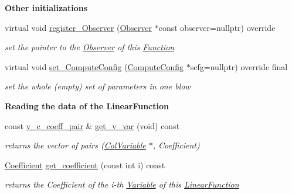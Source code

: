 \begin{Indent}\textbf{ Other initializations}\par
\begin{DoxyCompactItemize}
\item 
virtual void \mbox{\hyperlink{class_s_m_spp__di__unipi__it_1_1_linear_function_a0cb7093b112bfafe0b6d2b44f42fcc5a}{register\+\_\+\+Observer}} (\mbox{\hyperlink{class_s_m_spp__di__unipi__it_1_1_observer}{Observer}} $\ast$const observer=nullptr) override
\begin{DoxyCompactList}\small\item\em set the pointer to the \mbox{\hyperlink{class_s_m_spp__di__unipi__it_1_1_observer}{Observer}} of this \mbox{\hyperlink{class_s_m_spp__di__unipi__it_1_1_function}{Function}} \end{DoxyCompactList}\item 
virtual void \mbox{\hyperlink{class_s_m_spp__di__unipi__it_1_1_linear_function_af7a4779f8aa872d4a7ed3d2e0e62d29c}{set\+\_\+\+Compute\+Config}} (\mbox{\hyperlink{class_s_m_spp__di__unipi__it_1_1_compute_config}{Compute\+Config}} $\ast$scfg=nullptr) override final
\begin{DoxyCompactList}\small\item\em set the whole (empty) set of parameters in one blow \end{DoxyCompactList}\end{DoxyCompactItemize}
\end{Indent}
\begin{Indent}\textbf{ Reading the data of the Linear\+Function}\par
\begin{DoxyCompactItemize}
\item 
\mbox{\label{class_s_m_spp__di__unipi__it_1_1_linear_function_a372ad42188543f09b725e5d3762e70d4}} 
const \mbox{\hyperlink{class_s_m_spp__di__unipi__it_1_1_linear_function_a72e6ea928c14e2fd7f683ac34f8e3113}{v\+\_\+c\+\_\+coeff\+\_\+pair}} \& \mbox{\hyperlink{class_s_m_spp__di__unipi__it_1_1_linear_function_a372ad42188543f09b725e5d3762e70d4}{get\+\_\+v\+\_\+var}} (void) const
\begin{DoxyCompactList}\small\item\em returns the vector of pairs (\mbox{\hyperlink{class_s_m_spp__di__unipi__it_1_1_col_variable}{Col\+Variable}} $\ast$, Coefficient) \end{DoxyCompactList}\item 
\mbox{\hyperlink{class_s_m_spp__di__unipi__it_1_1_linear_function_a1fa0f848dbb8d52dc62a1adfee1a1f90}{Coefficient}} \mbox{\hyperlink{class_s_m_spp__di__unipi__it_1_1_linear_function_a554e8ed3d718353810d4484d078e9199}{get\+\_\+coefficient}} (const int i) const
\begin{DoxyCompactList}\small\item\em returns the Coefficient of the i-\/th \mbox{\hyperlink{class_s_m_spp__di__unipi__it_1_1_variable}{Variable}} of this \mbox{\hyperlink{class_s_m_spp__di__unipi__it_1_1_linear_function}{Linear\+Function}} \end{DoxyCompactList}\end{DoxyCompactItemize}
\end{Indent}

